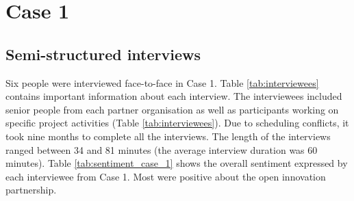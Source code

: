 \begin{table}[hbt!]
\bigskip
\begin{subtable}{1\textwidth}
\centering
{}%
\bigskip
\caption{Case 3}
\label{tab:sentiment_case_3}
\end{subtable}
\end{table}

\section{Case 1}

\subsection{Semi-structured interviews}

Six people were interviewed face-to-face in Case 1. Table \ref{tab:interviewees} contains important information about each interview. The interviewees included senior people from each partner organisation as well as participants working on specific project activities (Table \ref{tab:interviewees}). Due to scheduling conflicts, it took nine months to complete all the interviews. The length of the interviews ranged between 34 and 81 minutes (the average interview duration was 60 minutes). Table \ref{tab:sentiment_case_1} shows the overall sentiment expressed by each interviewee from Case 1. Most were positive about the open innovation partnership.

